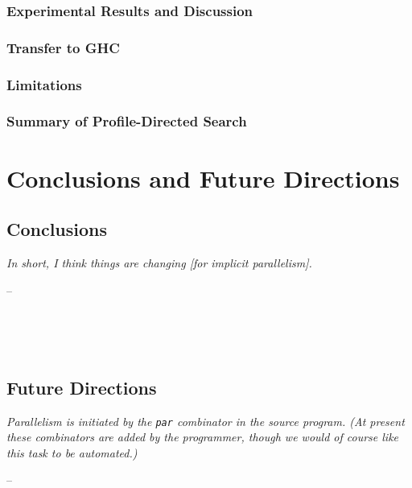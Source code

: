 \documentclass[openright, dottedtoc, headinclude, footinclude=true, a4paper, numbers=noenddot]{scrreprt}
\makeatletter
\newenvironment{chapquote}[2][2em]
  {\setlength{\@tempdima}{#1}%
   \def\chapquote@author{#2}%
   \parshape 1 \@tempdima \dimexpr\textwidth-2\@tempdima\relax%
   \itshape}
  {\par\normalfont\hfill--\ \chapquote@author\hspace*{\@tempdima}\par\noindent\hrulefill\\[1cm]}
\makeatother
\begin{document}
        \section{Experimental Results and Discussion}
        \label{sec:infResults}
        

        \section{Transfer to GHC}
        \label{sec:ghcComp}
        

        \section{Limitations}
        \label{sec:limits}
        

        \section{Summary of Profile-Directed Search}
        \label{sec:informedConclusion}
        

\part{Conclusions and Future Directions}
\label{part:conclusion}

    \chapter{Conclusions}
    \label{chap:conclusions}
    \begin{chapquote}{\cite{spjQuote2005}}
     In short, I think things are changing \emph{[for implicit parallelism]}.
    \end{chapquote}
    
    \\[1cm]
    
    
    \chapter{Future Directions}
    \label{chap:future}
    \begin{chapquote}{\cite{trinder1996gum}}
    Parallelism is initiated by the \verb'par' combinator in the source
    program. (At present these combinators are added by the programmer, though
    we would of course like this task to be automated.)
    \end{chapquote}
    
    
\end{document}
